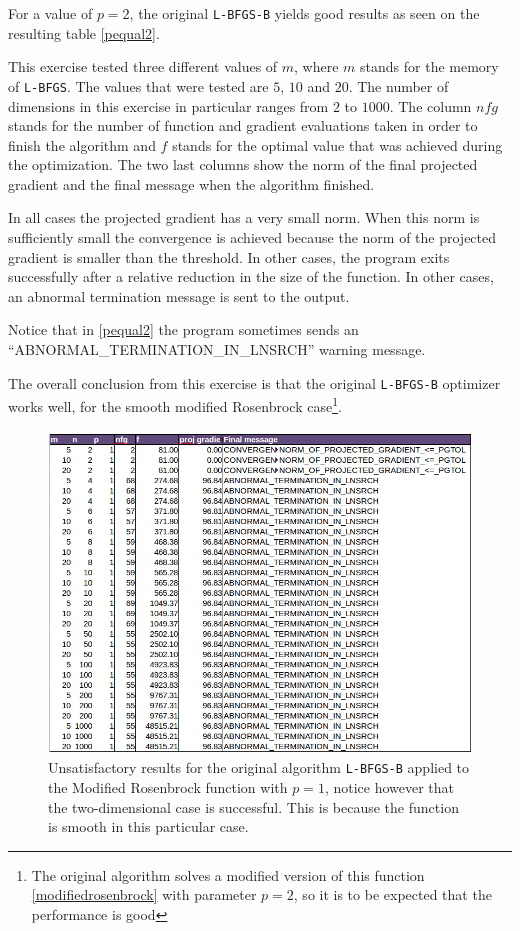 For a value of $p = 2$, the original \texttt{L-BFGS-B} yields good results as seen on the resulting table \eqref{pequal2}.

This exercise tested three different values of $m$, where $m$ stands for the memory of \texttt{L-BFGS}. The values that were tested are $5$, $10$ and $20$. The number of dimensions in this exercise in particular ranges from $2$ to $1000$. The column $nfg$ stands for the number of function and gradient evaluations taken in order to finish the algorithm and $f$ stands for the optimal value that was achieved during the optimization. The two last columns show the norm of the final projected gradient and the final message when the algorithm finished.

In all cases the projected gradient has a very small norm. When this norm is sufficiently small the convergence is achieved because the norm of the projected gradient is smaller than the threshold. In other cases, the program exits successfully after a relative reduction in the size of the function. In other cases, an abnormal termination message is sent to the output.

Notice that in \eqref{pequal2} the program sometimes sends an ``ABNORMAL\_TERMINATION\_IN\_LNSRCH'' warning message.

The overall conclusion from this exercise is that the original \texttt{L-BFGS-B} optimizer works well, for the smooth modified Rosenbrock case\footnote{The original algorithm solves a modified version of this function \eqref{modifiedrosenbrock} with parameter $p = 2$, so it is to be expected that the performance is good}.

\begin{figure}
\begin{center}
\includegraphics[scale=0.5]{Figures/abnormalNocedal.png}
\caption[Modified Rosenbrock with $p = 1$]{Unsatisfactory results for the original algorithm \texttt{L-BFGS-B} applied to the Modified Rosenbrock function with $p = 1$, notice however that the two-dimensional case is successful.  This is because the function is smooth in this particular case.}
\label{pequal1}
\end{center}
\end{figure}

